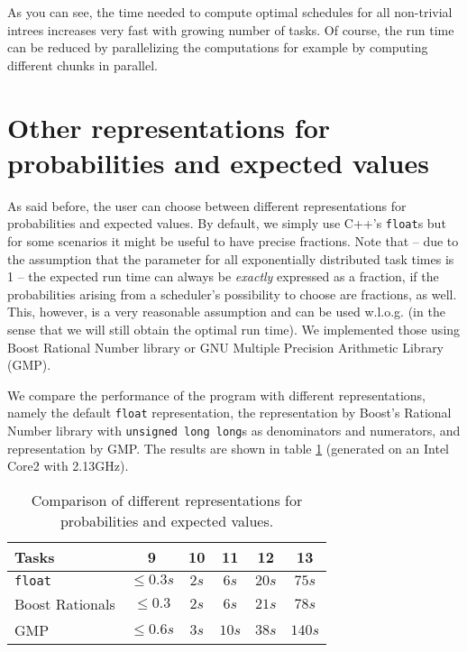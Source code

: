 As you can see, the time needed to compute optimal schedules for all non-trivial intrees increases very fast with growing number of tasks. Of course, the run time can be reduced by parallelizing the computations for example by computing different chunks in parallel.

\section{Other representations for probabilities and expected values}
\label{sec:benchmarks-myfloat-variations}

As said before, the user can choose between different representations for probabilities and expected values. By default, we simply use C++'s \texttt{float}s but for some scenarios it might be useful to have precise fractions. Note that -- due to the assumption that the parameter for all exponentially distributed task times is 1 -- the expected run time can always be \emph{exactly} expressed as a fraction, if the probabilities arising from a scheduler's possibility to choose are fractions, as well. This, however, is a very reasonable assumption and can be used w.l.o.g. (in the sense that we will still obtain the optimal run time).
We implemented those using Boost Rational Number library or GNU Multiple Precision Arithmetic Library (GMP).

We compare the performance of the program with different representations, namely the default \texttt{float} representation, the representation by Boost's Rational Number library with \texttt{unsigned long long}s as denominators and numerators, and representation by GMP. The results are shown in table \ref{tab:comparison-myfloat-variants} (generated on an Intel Core2 with 2.13GHz).

\begin{table}[th]
  \centering
  \begin{tabular}[ht]{lccccc}
    Tasks & 9 & 10 & 11 & 12 & 13 \\
    \hline 
    \texttt{float} & $\leq 0.3s$ & $2s$ & $6s$ & $20s$ & $75s$ \\
    Boost Rationals & $\leq 0.3$ & $2s$ & $6s$ & $21s$ & $78s$ \\
    GMP & $\leq 0.6s$ & $3s$ & $10s$ & $38s$ & $140s$
  \end{tabular}
  \caption{Comparison of different representations for probabilities and expected values.}
  \label{tab:comparison-myfloat-variants}
\end{table}

